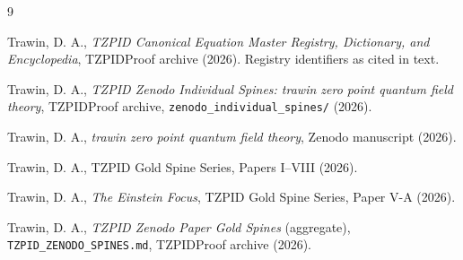 \documentclass[11pt]{article}
\theoremstyle{remark}
\begin{document}
\begin{thebibliography}{9}

 Trawin, D. A., \emph{TZPID Canonical Equation Master Registry, Dictionary, and Encyclopedia}, TZPIDProof archive (2026). Registry identifiers as cited in text.

 Trawin, D. A., \emph{TZPID Zenodo Individual Spines: trawin zero point quantum field theory}, TZPIDProof archive, \texttt{zenodo\_individual\_spines/} (2026).

 Trawin, D. A., \emph{trawin zero point quantum field theory}, Zenodo manuscript (2026).

 Trawin, D. A., TZPID Gold Spine Series, Papers I--VIII (2026).

 Trawin, D. A., \emph{The Einstein Focus}, TZPID Gold Spine Series, Paper V-A (2026).

 Trawin, D. A., \emph{TZPID Zenodo Paper Gold Spines} (aggregate), \texttt{TZPID\_ZENODO\_SPINES.md}, TZPIDProof archive (2026).

\end{thebibliography}
\end{document}
